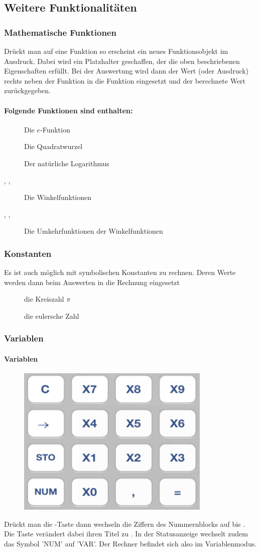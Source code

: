 \subsection{Weitere Funktionalitäten}
\subsubsection{Mathematische Funktionen}
Drückt man auf eine Funktion so erscheint ein neues Funktionsobjekt im Ausdruck.
Dabei wird ein Platzhalter geschaffen, der die oben beschriebenen Eigenschaften erfüllt.
Bei der Auswertung wird dann der Wert (oder Ausdruck) rechts neben der Funktion in die Funktion eingesetzt und der berechnete Wert zurückgegeben.
\paragraph{Folgende Funktionen sind enthalten:}
\begin{description}
	\item [] Die $e$-Funktion
	\item [\key{$\sqrt{}$}] Die Quadratwurzel
	\item [] Der natürliche Logarithmus
	\item [, , ] Die Winkelfunktionen
	\item [, , ] Die Umkehrfunktionen der Winkelfunktionen
\end{description}

\subsubsection{Konstanten}
Es ist auch möglich mit symbolischen Konstanten zu rechnen. Deren Werte werden dann beim
Auswerten in die Rechnung eingesetzt
\begin{description}
	\item [\key{$\pi$}] die Kreiszahl $\pi$
	\item [] die eulersche Zahl
\end{description}

\subsubsection{Variablen}
\paragraph{Variablen}
\begin{figure}[H]
	\centering
	\includegraphics[width=.3\textwidth]{landscape_var.png}
\end{figure}
Drückt man die -Taste dann wechseln die Ziffern des Nummernblocks auf  bis . Die Taste  verändert dabei ihren Titel zu . In der Statusanzeige wechselt zudem das Symbol 'NUM' auf 'VAR'. Der Rechner befindet sich also im Variablenmodus.

